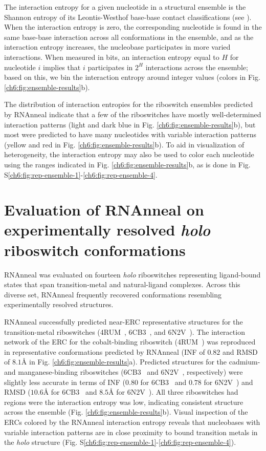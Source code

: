 The interaction entropy for a given nucleotide in a structural ensemble is the Shannon entropy of its Leontis-Westhof base-base contact classifications (see ). When the interaction entropy is zero, the corresponding nucleotide is found in the same base-base interaction  across all conformations in the ensemble, and as the interaction entropy increases, the nucleobase participates in more varied interactions. When measured in bits, an interaction entropy equal to $H$ for nucleotide $i$ implies that $i$ participates in $2^H$ interactions across the ensemble; based on this, we bin the interaction entropy around integer values (colors in Fig. \ref{ch6:fig:ensemble-results}b).

The distribution of interaction entropies for the riboswitch ensembles predicted by RNAnneal indicate that a few of the riboswitches have mostly well-determined interaction patterns (light and dark blue in Fig. \ref{ch6:fig:ensemble-results}b), but most were predicted to have many nucleotides with variable interaction patterns (yellow and red in Fig. \ref{ch6:fig:ensemble-results}b). To aid in visualization of heterogeneity, the interaction entropy may also be used to color each nucleotide using the ranges indicated in Fig. \ref{ch6:fig:ensemble-results}b, as is done in Fig. S\ref{ch6:fig:rep-ensemble-1}-\ref{ch6:fig:rep-ensemble-4}.

\section{Evaluation of RNAnneal on experimentally resolved \textrm{\textbf{\textit{holo}}}  riboswitch conformations}

RNAnneal was evaluated on fourteen {\it holo} riboswitches representing ligand-bound states that span transition-metal and natural-ligand complexes. Across this diverse set, RNAnneal frequently recovered conformations resembling experimentally resolved structures.

RNAnneal successfully predicted near-ERC representative structures for the transition-metal riboswitches (4RUM~\cite{Ramesh2014}, 6CB3~\cite{Bachas2018}, and 6N2V~\cite{Price2018}). The interaction network of the ERC for the cobalt-binding riboswitch (4RUM~\cite{Ramesh2014}) was reproduced in representative conformations predicted by RNAnneal (INF of $0.82$ and RMSD of $8.1${\AA} in Fig. \ref{ch6:fig:ensemble-results}a). Predicted structures for the cadmium- and manganese-binding riboswitches (6CB3~\cite{Bachas2018} and 6N2V~\cite{Price2018}, respectively) were slightly less accurate in terms of INF ($0.80$ for 6CB3~\cite{Bachas2018} and $0.78$ for 6N2V~\cite{Price2018}) and RMSD ($10.6${\AA} for 6CB3~\cite{Bachas2018} and $8.5${\AA} for 6N2V~\cite{Price2018}). All three riboswitches had regions were the interaction entropy was low, indicating consistent structure across the ensemble (Fig. \ref{ch6:fig:ensemble-results}b). Visual inspection of the ERCs colored by the RNAnneal interaction entropy reveals that nucleobases with variable interaction patterns are in close proximity to bound transition metals in the {\it holo} structure (Fig. S\ref{ch6:fig:rep-ensemble-1}-\ref{ch6:fig:rep-ensemble-4}).

